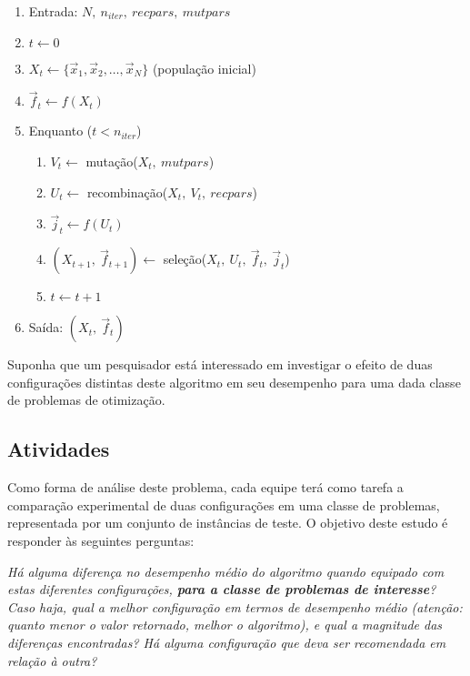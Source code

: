 \documentclass[11pt,twoside,printwatermark=false]{pinp}
\providecommand{\tightlist}{%
  \setlength{\itemsep}{0pt}\setlength{\parskip}{0pt}}
\begin{document}
\begin{enumerate}
\def\labelenumi{\arabic{enumi}.}
\setcounter{enumi}{-1}
\tightlist
\item
  Entrada: \(N,\ n_{iter},\ recpars,\ mutpars\)
\item
  \(t \leftarrow 0\)
\item
  \(X_t \leftarrow \{\vec{x}_1, \vec{x}_2, \ldots, \vec{x}_N\}\)
  (população inicial)
\item
  \(\vec{f}_t \leftarrow f(X_t)\)
\item
  Enquanto (\(t < n_{iter}\))

  \begin{enumerate}
  \def\labelenumii{\arabic{enumii}.}
  \tightlist
  \item
    \(V_t \leftarrow\) mutação(\(X_t,\ mutpars\))
  \item
    \(U_t \leftarrow\) recombinação(\(X_t,\ V_t,\ recpars\))
  \item
    \(\vec{j}_t \leftarrow f(U_t)\)
  \item
    \((X_{t+1},\ \vec{f}_{t+1}) \leftarrow\)
    seleção(\(X_t,\ U_t,\ \vec{f}_t,\ \vec{j}_t\))
  \item
    \(t \leftarrow t + 1\)
  \end{enumerate}
\item
  Saída: \((X_t,\ \vec{f}_t)\)
\end{enumerate}

Suponha que um pesquisador está interessado em investigar o efeito de
duas configurações distintas deste algoritmo em seu desempenho para uma
dada classe de problemas de otimização.

\subsection{Atividades}\label{atividades}

Como forma de análise deste problema, cada equipe terá como tarefa a
comparação experimental de duas configurações em uma classe de
problemas, representada por um conjunto de instâncias de teste. O
objetivo deste estudo é responder às seguintes perguntas:

\begin{center}\textit{Há alguma diferença no desempenho médio do algoritmo quando equipado com estas diferentes configurações, \textbf{para a classe de problemas de interesse}? Caso haja, qual a melhor configuração em termos de desempenho médio (atenção: quanto \textit{menor} o valor retornado, melhor o algoritmo), e qual a magnitude das diferenças encontradas? Há alguma configuração que deva ser recomendada em relação à outra?}\end{center}
\end{document}
